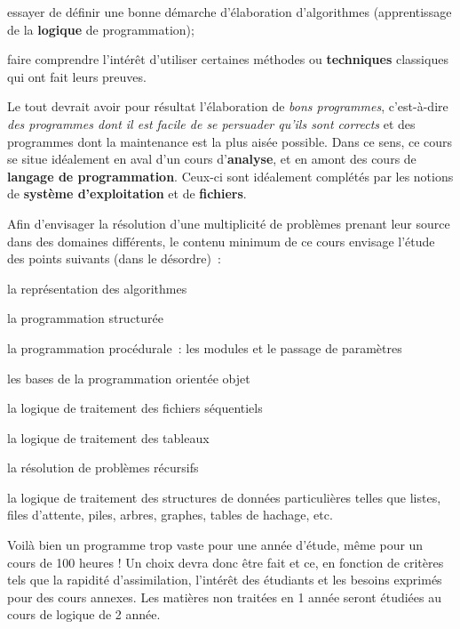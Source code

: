 	\begin{liste}
	\item
		essayer de définir une bonne démarche d’élaboration d’algorithmes
		(apprentissage de la \textbf{logique} de programmation);
	\item
		faire comprendre l’intérêt d’utiliser certaines méthodes ou
		\textbf{techniques} classiques qui ont fait leurs preuves.
	\end{liste}

	Le tout devrait avoir pour résultat l’élaboration de \textit{bons
	programmes}, c’est-à-dire \textit{des programmes dont il est facile de
	se persuader qu’ils sont corrects} et des programmes dont la
	maintenance est la plus aisée possible. Dans ce sens, ce cours se situe
	idéalement en aval d’un cours d’\textbf{analyse}, et en amont des cours
	de \textbf{langage de programmation}. Ceux-ci sont idéalement complétés
	par les notions de \textbf{système d’exploitation} et de
	\textbf{fichiers}.

	Afin d’envisager la résolution d’une multiplicité de problèmes prenant
	leur source dans des domaines différents, le contenu minimum de ce
	cours envisage l’étude des points suivants (dans le désordre)~:

	\begin{liste}
	\item 
		la représentation des algorithmes
	\item
		la programmation structurée
	\item
		la programmation procédurale~: les modules et 
		le passage de paramètres
	\item
		les bases de la programmation orientée objet
	\item
		la logique de traitement des fichiers séquentiels
	\item
		la logique de traitement des tableaux
	\item
		la résolution de problèmes récursifs
	\item
		la logique de traitement des structures de données particulières telles
		que listes, files d’attente, piles, arbres, graphes, tables de hachage,
		etc.
	\end{liste}

	Voilà bien un programme trop vaste pour une année d’étude, même pour un
	cours de 100 heures ! Un choix devra donc être fait et ce, en fonction
	de critères tels que la rapidité d’assimilation, l’intérêt des
	étudiants et les besoins exprimés pour des cours annexes. Les
	matières non traitées en 1 année 
	seront étudiées au cours de logique de 2 année.

